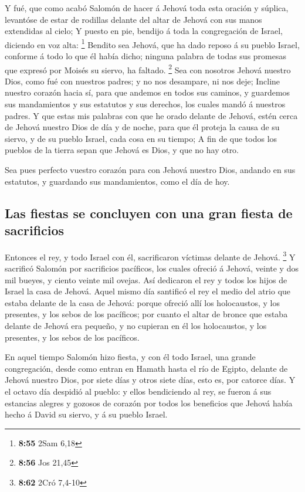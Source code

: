  Y fué, que como acabó Salomón de hacer á Jehová toda
esta oración y súplica, levantóse de estar de rodillas delante del altar
de Jehová con sus manos extendidas al cielo;  Y puesto en
pie, bendijo á toda la congregación de Israel, diciendo en voz alta:
\footnote{\textbf{8:55} 2Sam 6,18}  Bendito sea Jehová,
que ha dado reposo á su pueblo Israel, conforme á todo lo que él había
dicho; ninguna palabra de todas sus promesas que expresó por Moisés su
siervo, ha faltado. \footnote{\textbf{8:56} Jos 21,45} 
Sea con nosotros Jehová nuestro Dios, como fué con nuestros padres; y no
nos desampare, ni nos deje;  Incline nuestro corazón
hacia sí, para que andemos en todos sus caminos, y guardemos sus
mandamientos y sus estatutos y sus derechos, los cuales mandó á nuestros
padres.  Y que estas mis palabras con que he orado
delante de Jehová, estén cerca de Jehová nuestro Dios de día y de noche,
para que él proteja la causa de su siervo, y de su pueblo Israel, cada
cosa en su tiempo;  A fin de que todos los pueblos de la
tierra sepan que Jehová es Dios, y que no hay otro.

 Sea pues perfecto vuestro corazón para con Jehová
nuestro Dios, andando en sus estatutos, y guardando sus mandamientos,
como el día de hoy.

\hypertarget{las-fiestas-se-concluyen-con-una-gran-fiesta-de-sacrificios}{%
\subsection{Las fiestas se concluyen con una gran fiesta de
sacrificios}\label{las-fiestas-se-concluyen-con-una-gran-fiesta-de-sacrificios}}

 Entonces el rey, y todo Israel con él, sacrificaron
víctimas delante de Jehová. \footnote{\textbf{8:62} 2Cró 7,4-10}
 Y sacrificó Salomón por sacrificios pacíficos, los
cuales ofreció á Jehová, veinte y dos mil bueyes, y ciento veinte mil
ovejas. Así dedicaron el rey y todos los hijos de Israel la casa de
Jehová.  Aquel mismo día santificó el rey el medio del
atrio que estaba delante de la casa de Jehová: porque ofreció allí los
holocaustos, y los presentes, y los sebos de los pacíficos; por cuanto
el altar de bronce que estaba delante de Jehová era pequeño, y no
cupieran en él los holocaustos, y los presentes, y los sebos de los
pacíficos.

 En aquel tiempo Salomón hizo fiesta, y con él todo
Israel, una grande congregación, desde como entran en Hamath hasta el
río de Egipto, delante de Jehová nuestro Dios, por siete días y otros
siete días, esto es, por catorce días.  Y el octavo día
despidió al pueblo: y ellos bendiciendo al rey, se fueron á sus
estancias alegres y gozosos de corazón por todos los beneficios que
Jehová había hecho á David su siervo, y á su pueblo Israel.

